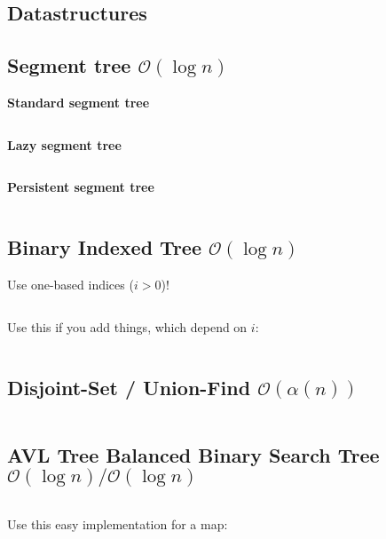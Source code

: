 \documentclass[8pt,a4paper,landscape,oneside]{amsart}
\newcommand{\code}[1]{\inputminted[fontsize=\normalsize,baselinestretch=1,breaklines,tabsize=2]{cpp}{code/#1}}
\begin{document}
\begin{multicols*}{3}
\section{Datastructures}
\subsection{Segment tree $\mathcal{O}(\log n)$}

\textbf{Standard segment tree}
\code{datastructures/segment_tree.cpp}

\textbf{Lazy segment tree}
\code{datastructures/lazy_segment_tree.cpp}

\textbf{Persistent segment tree}
\code{datastructures/persistent_segment_tree.cpp}

\subsection{Binary Indexed Tree $\mathcal{O}(\log n)$}

Use one-based indices ($i > 0$)!
\code{datastructures/bit.cpp}

Use this if you add things, which depend on $i$:
\code{datastructures/fenwick_tree.cpp}

\subsection{Disjoint-Set / Union-Find $\mathcal{O}(\alpha (n))$}
\code{datastructures/dsu.cpp}

\subsection{AVL Tree Balanced Binary Search Tree $\mathcal{O}(\log n) / \mathcal{O}(\log n)$}
\code{datastructures/avl_tree.cpp}

Use this easy implementation for a map:
\code{datastructures/avl_tree_map.cpp}


\end{multicols*}
\end{document}

